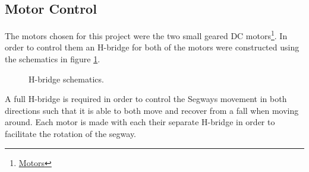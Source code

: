
\subsection{Motor Control}
The motors chosen for this project were the two small geared DC motors\footnote{ \href{https://www.sparkfun.com/products/13258}{Motors}}.
In order to control them an H-bridge for both of the motors were constructed using the schematics in figure \ref{fig:hbridge}.


\begin{figure}[H]
\centering

\caption{H-bridge schematics.}
\label{fig:hbridge}
\end{figure}

A full H-bridge is required in order to control the Segways movement in both directions such that it is able to both move and recover from a fall when moving around.
Each motor is made with each their separate H-bridge in order to facilitate the rotation of the segway.

